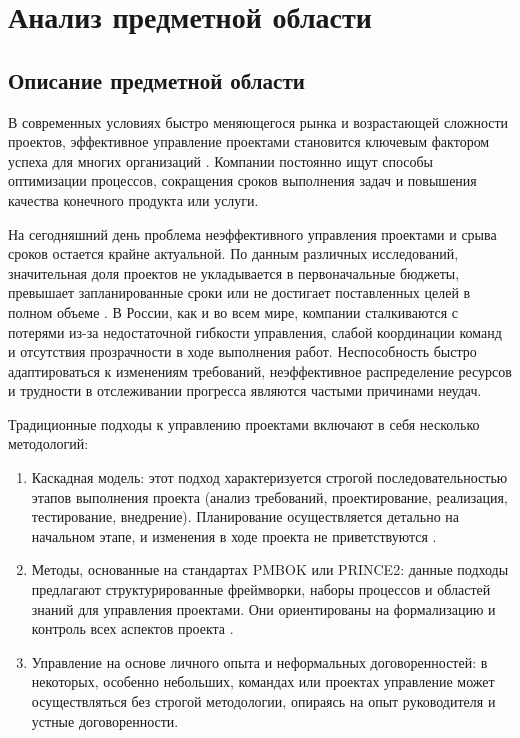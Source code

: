 \section{Анализ предметной области}
\subsection{Описание предметной области}
В современных условиях быстро меняющегося рынка и возрастающей сложности проектов, эффективное управление проектами становится ключевым фактором успеха для многих организаций \cite{management1}. Компании постоянно ищут способы оптимизации процессов, сокращения сроков выполнения задач и повышения качества конечного продукта или услуги.

На сегодняшний день проблема неэффективного управления проектами и срыва сроков остается крайне актуальной. По данным различных исследований, значительная доля проектов не укладывается в первоначальные бюджеты, превышает запланированные сроки или не достигает поставленных целей в полном объеме \cite{management2}. В России, как и во всем мире, компании сталкиваются с потерями из-за недостаточной гибкости управления, слабой координации команд и отсутствия прозрачности в ходе выполнения работ. Неспособность быстро адаптироваться к изменениям требований, неэффективное распределение ресурсов \cite{management3} и трудности в отслеживании прогресса являются частыми причинами неудач.

Традиционные подходы к управлению проектами включают в себя несколько методологий:

\begin{enumerate}
	\item Каскадная модель: этот подход характеризуется строгой последовательностью этапов выполнения проекта (анализ требований, проектирование, реализация, тестирование, внедрение). Планирование осуществляется детально на начальном этапе, и изменения в ходе проекта не приветствуются \cite{management2}.
	\item Методы, основанные на стандартах PMBOK или PRINCE2: данные подходы предлагают структурированные фреймворки, наборы процессов и областей знаний для управления проектами. Они ориентированы на формализацию и контроль всех аспектов проекта \cite{management1}.
	\item Управление на основе личного опыта и неформальных договоренностей: в некоторых, особенно небольших, командах или проектах управление может осуществляться без строгой методологии, опираясь на опыт руководителя и устные договоренности.
\end{enumerate}

